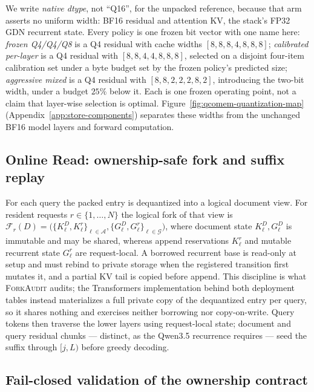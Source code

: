 \documentclass{article}
\newcommand{\method}{\textsc{ForkAudit}}
\begin{document}
We write \emph{native dtype}, not ``Q16'', for the unpacked reference, because
that arm asserts no uniform width: BF16 residual and attention KV, the stack's
FP32 GDN recurrent state.  Every policy is one frozen bit vector with one name
here: \emph{frozen Q4/Q4/Q8} is a Q4 residual with cache widths $[8,8,8,4,8,8,8]$; \emph{calibrated per-layer} is a Q4 residual with
$[8,8,4,4,8,8,8]$, selected on a disjoint four-item calibration set under a byte
budget set by the frozen policy's predicted size; \emph{aggressive mixed} is a
Q4 residual with $[8,8,2,2,2,8,2]$, introducing the two-bit width, under a
budget $25\%$ below it.  Each is one frozen operating point, not a claim that
layer-wise selection is optimal.  Figure~\ref{fig:qcomem-quantization-map}
(Appendix~\ref{app:store-components}) separates these widths from the unchanged
BF16 model layers and forward computation.

\subsection{Online Read: ownership-safe fork and suffix replay}
\label{sec:read}

For each query the packed entry is dequantized into a logical document view.
For resident requests \(r\in\{1,\ldots,N\}\) the logical fork of that view is
\(\mathcal{F}_r(D)=\bigl(\{K^D_\ell,K^r_\ell\}_{\ell\in\mathcal A},
\{G^D_\ell,G^r_\ell\}_{\ell\in\mathcal G}\bigr)\), where document state
\(K^D_\ell,G^D_\ell\) is immutable and may be shared, whereas append
reservations \(K^r_\ell\) and mutable recurrent state \(G^r_\ell\) are
request-local. A borrowed recurrent base is read-only at setup and must rebind to private storage when
the registered transition first mutates it, and a partial KV tail is copied
before append. This discipline is what \method{} audits; the Transformers
implementation behind both deployment tables instead materializes a full
private copy of the dequantized entry per query, so it shares nothing and
exercises neither borrowing nor copy-on-write. Query tokens then traverse the
lower layers using request-local state; document and query residual chunks ---
distinct, as the Qwen3.5 recurrence requires --- seed the suffix through
$[j,L)$ before greedy decoding.

\subsection{Fail-closed validation of the ownership contract}
\label{sec:contract}
\end{document}
